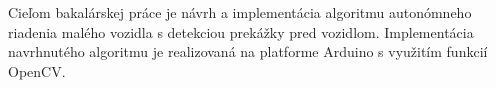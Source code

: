 Cieľom bakalárskej práce je návrh a implementácia algoritmu autonómneho riadenia malého vozidla s detekciou prekážky pred vozidlom. Implementácia navrhnutého algoritmu je realizovaná na platforme Arduino s využitím funkcií OpenCV.
